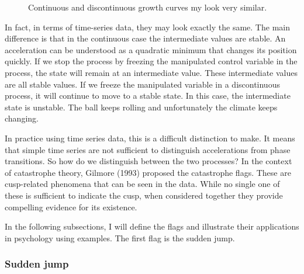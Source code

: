 \documentclass[
  a4paper,
  DIV=11,
  numbers=noendperiod,
  oneside]{scrreprt}
\begin{document}
\begin{figure}


\caption{\label{fig-ch3-img18-old-30}Continuous and discontinuous growth
curves my look very similar.}

\end{figure}%

In fact, in terms of time-series data, they may look exactly the same.
The main difference is that in the continuous case the intermediate
values are stable. An acceleration can be understood as a quadratic
minimum that changes its position quickly. If we stop the process by
freezing the manipulated control variable in the process, the state will
remain at an intermediate value. These intermediate values are all
stable values. If we freeze the manipulated variable in a discontinuous
process, it will continue to move to a stable state. In this case, the
intermediate state is unstable. The ball keeps rolling and unfortunately
the climate keeps changing.

In practice using time series data, this is a difficult distinction to
make. It means that simple time series are not sufficient to distinguish
accelerations from phase transitions. So how do we distinguish between
the two processes? In the context of catastrophe theory, Gilmore (1993)
proposed the catastrophe flags. These are cusp-related phenomena that
can be seen in the data. While no single one of these is sufficient to
indicate the cusp, when considered together they provide compelling
evidence for its existence.

In the following subsections, I will define the flags and illustrate
their applications in psychology using examples. The first flag is the
sudden jump.

\subsubsection{Sudden jump}\label{sec-Sudden-jump}
\end{document}
